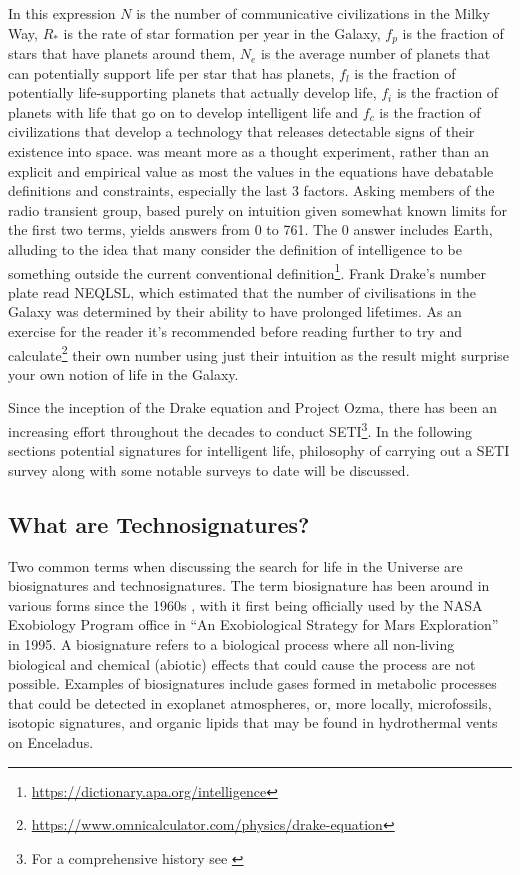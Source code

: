  In this expression $N$ is the number of communicative civilizations in the Milky Way, $R_{*}$ is the rate of star formation per year in the Galaxy, $f_{p}$ is the fraction of stars that have planets around them, $N_{e}$ is the average number of planets that can potentially support life per star that has planets, $f_{l}$ is the fraction of potentially life-supporting planets that actually develop life, $f_{i}$ is the fraction of planets with life that go on to develop intelligent life and $f_{c}$ is the fraction of civilizations that develop a technology that releases detectable signs of their existence into space.  was meant more as a thought experiment, rather than an explicit and empirical value as most the values in the equations have debatable definitions and constraints, especially the last 3 factors. Asking members of the radio transient group, based purely on intuition given somewhat known limits for the first two terms, yields answers from 0 to 761. The 0 answer includes Earth, alluding to the idea that many consider the definition of intelligence to be something outside the current conventional definition\footnote{\url{https://dictionary.apa.org/intelligence}}. Frank Drake's number plate read NEQLSL, which estimated that the number of civilisations in the Galaxy was determined by their ability to have prolonged lifetimes. As an exercise for the reader it's recommended before reading further to try and calculate\footnote{\url{https://www.omnicalculator.com/physics/drake-equation}} their own number using just their intuition as the result might surprise your own notion of life in the Galaxy. 

 Since the inception of the Drake equation and Project Ozma, there has been an increasing effort throughout the decades to conduct SETI\footnote{For a comprehensive history see \cite{Charbonneau2024}}. In the following sections potential signatures for intelligent life, philosophy of carrying out a SETI survey along with some notable surveys to date will be discussed. 

\subsection{What are Technosignatures?}

Two common terms when discussing the search for life in the Universe are biosignatures and technosignatures. The term biosignature has been around in various forms since the 1960s \citep{lederberg_signs_1965,lovelock_physical_1965}, with it first being officially used by the NASA Exobiology Program office in ``An Exobiological Strategy for Mars Exploration'' in 1995. A biosignature refers to a biological process where all non-living biological and chemical (abiotic) effects that could cause the process are not possible. Examples of biosignatures include gases formed in metabolic processes that could be detected in exoplanet atmospheres, or, more locally, microfossils, isotopic signatures, and organic lipids that may be found in hydrothermal vents on Enceladus. 


